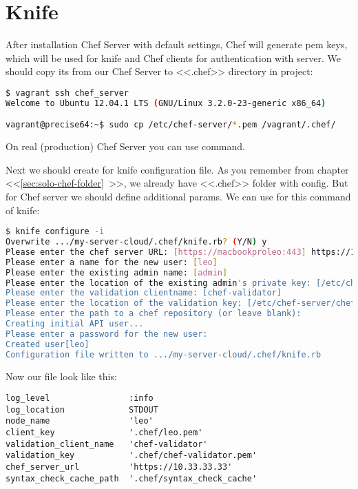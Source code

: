 \section{Knife}
\label{sec:server-knife}

After installation Chef Server with default settings, Chef will generate pem keys, which will be used for knife and Chef clients for authentication with server. We should copy its from our Chef Server to <<.chef>> directory in project:

\begin{lstlisting}[language=Bash,label=lst:my-server-cloud-knife1]
$ vagrant ssh chef_server
Welcome to Ubuntu 12.04.1 LTS (GNU/Linux 3.2.0-23-generic x86_64)

vagrant@precise64:~$ sudo cp /etc/chef-server/*.pem /vagrant/.chef/
\end{lstlisting}

On real (production) Chef Server you can use  command.

Next we should create for knife configuration file. As you remember from chapter <<\ref{sec:solo-chef-folder}~>>, we already have <<.chef>> folder with  config. But for Chef server we should define additional params. We can use for this  command of knife:

\begin{lstlisting}[language=Bash,label=lst:my-server-cloud-knife2]
$ knife configure -i
Overwrite .../my-server-cloud/.chef/knife.rb? (Y/N) y
Please enter the chef server URL: [https://macbookproleo:443] https://10.33.33.33
Please enter a name for the new user: [leo]
Please enter the existing admin name: [admin]
Please enter the location of the existing admin's private key: [/etc/chef-server/admin.pem] .chef/admin.pem
Please enter the validation clientname: [chef-validator]
Please enter the location of the validation key: [/etc/chef-server/chef-validator.pem] .chef/chef-validator.pem
Please enter the path to a chef repository (or leave blank):
Creating initial API user...
Please enter a password for the new user:
Created user[leo]
Configuration file written to .../my-server-cloud/.chef/knife.rb
\end{lstlisting}

Now our file look like this:

\begin{lstlisting}[label=lst:my-server-cloud-knife3,title=my-server-cloud/.chef/knife.rb]
log_level                :info
log_location             STDOUT
node_name                'leo'
client_key               '.chef/leo.pem'
validation_client_name   'chef-validator'
validation_key           '.chef/chef-validator.pem'
chef_server_url          'https://10.33.33.33'
syntax_check_cache_path  '.chef/syntax_check_cache'
\end{lstlisting}

